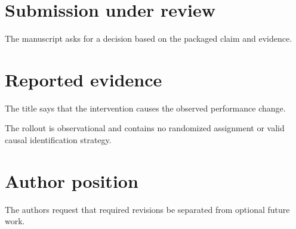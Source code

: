 \documentclass{article}
\begin{document}
\section{Submission under review}
The manuscript asks for a decision based on the packaged claim and evidence.
\section{Reported evidence}
The title says that the intervention causes the observed performance change.

The rollout is observational and contains no randomized assignment or valid causal identification strategy.
\section{Author position}
The authors request that required revisions be separated from optional future work.
\end{document}
